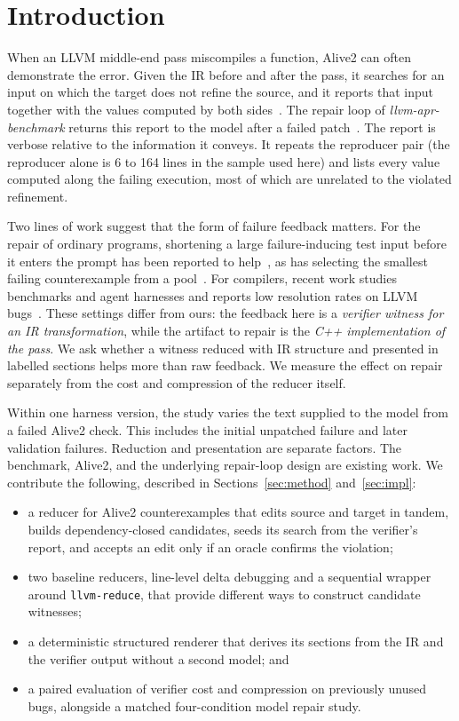\documentclass[conference]{IEEEtran}
\begin{document}
\section{Introduction}

When an LLVM middle-end pass miscompiles a function, Alive2 can often demonstrate the error. Given the IR before and after the pass, it searches for an input on which the target does not refine the source, and it reports that input together with the values computed by both sides~\cite{lopes2021alive2}. The repair loop of \emph{llvm-apr-benchmark} returns this report to the model after a failed patch~\cite{zheng2025aprbench}. The report is verbose relative to the information it conveys. It repeats the reproducer pair (the reproducer alone is 6 to 164 lines in the sample used here) and lists every value computed along the failing execution, most of which are unrelated to the violated refinement.

Two lines of work suggest that the form of failure feedback matters. For the repair of ordinary programs, shortening a large failure-inducing test input before it enters the prompt has been reported to help~\cite{yang2026reducefix}, as has selecting the smallest failing counterexample from a pool~\cite{he2026pgs}. For compilers, recent work studies benchmarks and agent harnesses and reports low resolution rates on LLVM bugs~\cite{zheng2026harness,tian2026llvmbench}. These settings differ from ours: the feedback here is a \emph{verifier witness for an IR transformation}, while the artifact to repair is the \emph{C++ implementation of the pass}. We ask whether a witness reduced with IR structure and presented in labelled sections helps more than raw feedback. We measure the effect on repair separately from the cost and compression of the reducer itself.

Within one harness version, the study varies the text supplied to the model from a failed Alive2 check. This includes the initial unpatched failure and later validation failures. Reduction and presentation are separate factors. The benchmark, Alive2, and the underlying repair-loop design are existing work. We contribute the following, described in Sections~\ref{sec:method} and~\ref{sec:impl}:
\begin{itemize}
\item a reducer for Alive2 counterexamples that edits source and target in tandem, builds dependency-closed candidates, seeds its search from the verifier's report, and accepts an edit only if an oracle confirms the violation;
\item two baseline reducers, line-level delta debugging and a sequential wrapper around \texttt{llvm-reduce}, that provide different ways to construct candidate witnesses;
\item a deterministic structured renderer that derives its sections from the IR and the verifier output without a second model; and
\item a paired evaluation of verifier cost and compression on previously unused bugs, alongside a matched four-condition model repair study.
\end{itemize}
\end{document}
